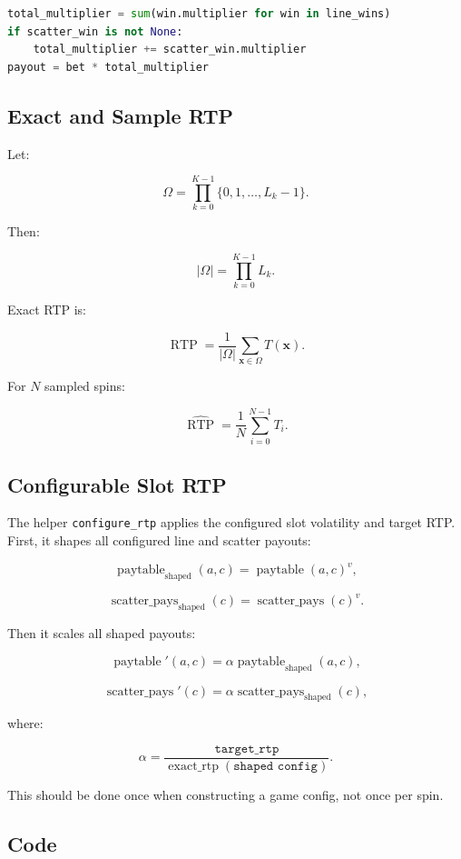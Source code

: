 \documentclass[11pt]{article}
\begin{document}
\begin{lstlisting}[language=Python]
total_multiplier = sum(win.multiplier for win in line_wins)
if scatter_win is not None:
    total_multiplier += scatter_win.multiplier
payout = bet * total_multiplier
\end{lstlisting}

\subsection{Exact and Sample RTP}

Let:

\[
\Omega=\prod_{k=0}^{K-1}\{0,1,\ldots,L_k-1\}.
\]

Then:

\[
|\Omega|=\prod_{k=0}^{K-1}L_k.
\]

Exact RTP is:

\[
\operatorname{RTP}
=
\frac{1}{|\Omega|}
\sum_{\mathbf{x}\in\Omega}T(\mathbf{x}).
\]

For \(N\) sampled spins:

\[
\widehat{\operatorname{RTP}}
=
\frac{1}{N}\sum_{i=0}^{N-1}T_i.
\]

\subsection{Configurable Slot RTP}

The helper \texttt{configure\_rtp} applies the configured slot volatility and target RTP. First, it shapes all configured line and scatter payouts:

\[
\operatorname{paytable}_{\text{shaped}}(a,c) = \operatorname{paytable}(a,c)^v,
\]

\[
\operatorname{scatter\_pays}_{\text{shaped}}(c) = \operatorname{scatter\_pays}(c)^v.
\]

Then it scales all shaped payouts:

\[
\operatorname{paytable}'(a,c) = \alpha \operatorname{paytable}_{\text{shaped}}(a,c),
\]

\[
\operatorname{scatter\_pays}'(c) = \alpha \operatorname{scatter\_pays}_{\text{shaped}}(c),
\]

where:

\[
\alpha = \frac{\texttt{target\_rtp}}{\operatorname{exact\_rtp}(\texttt{shaped config})}.
\]

This should be done once when constructing a game config, not once per spin.

\subsection{Code}
\end{document}
